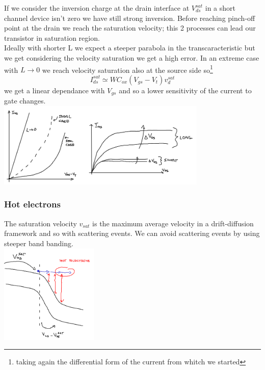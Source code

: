 If we consider the inversion charge at the drain interface at $V_{ds}^{sat}$ in a short channel device isn't zero we have still strong inversion. Before reaching pinch-off point at the drain we reach the saturation velocity; this 2 processes can lead our transistor in saturation region.\\
Ideally with shorter L we expect a steeper parabola in the transcaracteristic but we get considering the velocity saturation we get a high error. In an extreme case with $L\rightarrow 0$ we reach velocity saturation also at the source side so\footnote{taking again the differential form of the current from whitch we started}
\begin{equation}
I_{ds}^{sat}\simeq WC_{ox}(V_{gs}-V_t)v_d^{sat}
\end{equation}
 we get a linear dependance with $V_{gs}$ and so a lower sensitivity of the current to gate changes.\\

\centering
\includegraphics[width=0.75\textwidth]{shorta.png}\\
\raggedright

\subsubsection{Hot electrons}
The saturation velocity $v_{sat}$ is the maximum average velocity in a drift-diffusion framework and so with scattering events. We can avoid scattering events by using steeper band banding.\\

\centering
\includegraphics[width=0.35\textwidth]{hotelectrons.png}\\
\raggedright

